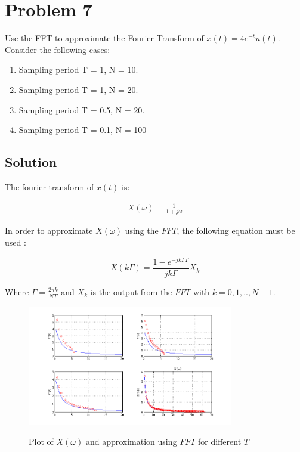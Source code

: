 \section*{Problem 7}

Use the FFT to approximate the Fourier Transform of $x(t) = 4e^{-t}u(t)$. 
Consider the following cases:

\begin{enumerate}
\item Sampling period T = 1, N = 10.
\item Sampling period T = 1, N = 20.
\item Sampling period T = 0.5, N = 20.
\item Sampling period T = 0.1, N = 100
\end{enumerate} 

\subsection*{Solution}

The fourier transform of $x(t)$ is:

\begin{equation*}
\begin{aligned}
X(\omega) = \frac{1}{1 +j \omega}
\end{aligned}
\end{equation*}

In order to approximate $X(\omega)$ using the $FFT$, the following
equation must be used \cite{kamen2000fundamentals}:

\begin{equation}
X(k\Gamma) = \frac{1 - e^{-j k \Gamma T}}{j k \Gamma} X_k
\label{eq:fftapprox}
\end{equation} 

Where $\Gamma = \frac{2\pi k}{N T}$ and $X_k$ is the output from the $FFT$ with $k=0,1,..,N-1$.


\begin{figure}[H]
\caption{Plot of $X(\omega)$ and approximation using $FFT$ for different $T$}
\centering
\includegraphics[width=0.8\textwidth]{figs/c4p7.png}
\label{fig:c4p7}
\end{figure}

